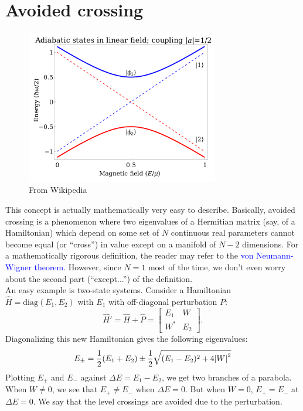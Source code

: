 \documentclass{book}
\theoremstyle{definition}
\newcommand{\f}[2]{\frac{#1}{#2}}
\begin{document}
\section*{Avoided crossing}


\begin{figure}[!htb]
	\centering
	\includegraphics*[width=0.75\textwidth]{images/avoided_crossing}
	\caption{From Wikipedia}
\end{figure}


This concept is actually mathematically very easy to describe. Basically, avoided crossing is a phenomenon where two eigenvalues of a Hermitian matrix (say, of a Hamiltonian) which depend on some set of $N$ continuous real parameters cannot become equal (or ``cross'') in value except on a manifold of $N-2$ dimensions. For a mathematically rigorous definition, the reader may refer to the \textcolor{blue}{von Neumann-Wigner theorem}. However, since $N=1$ most of the time, we don't even worry about the second part (``except...'') of the definition.\\


An easy example is two-state systems. Consider a Hamiltonian $\widehat{H} = \text{diag}(E_1, E_2)$ with $E_1$ with off-diagonal perturbation $P$:
\begin{equation*}
\widehat{H}' = \widehat{H} + \widehat{P} = \begin{bmatrix}
E_1 & W \\ W^* & E_2
\end{bmatrix}.
\end{equation*}
Diagonalizing this new Hamiltonian gives the following eigenvalues:
\begin{equation*}
E_{\pm} = \f{1}{2}(E_1 + E_2) \pm \f{1}{2}\sqrt{(E_1 - E_2)^2 + 4\abs{W}^2}
\end{equation*}
Plotting $E_+$ and $E_-$ against $\Delta E = E_1  - E_2$, we get two branches of a parabola. When $W \neq 0$, we see that $E_+ \neq E_-$ when $\Delta  E = 0$. But when $W = 0$, $E_+ = E_-$ at $\Delta E = 0$. We say that the level crossings are avoided due to the perturbation. 
\end{document}
